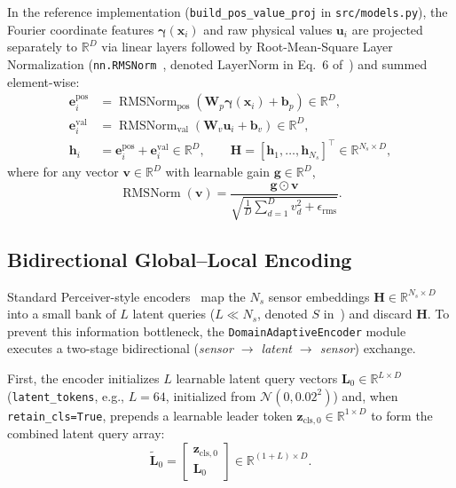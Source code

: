 In the reference implementation (\texttt{build\_pos\_value\_proj} in \texttt{src/models.py}), the Fourier coordinate features $\boldsymbol{\gamma}(\mathbf{x}_i)$ and raw physical values $\mathbf{u}_i$ are projected separately to $\mathbb{R}^D$ via linear layers followed by Root-Mean-Square Layer Normalization (\texttt{nn.RMSNorm}~\cite{zhang2019rmsnorm}, denoted $\text{LayerNorm}$ in Eq.~6 of~\cite{wang2026glu}) and summed element-wise:
\begin{align}
    \mathbf{e}_i^{\text{pos}} &= \operatorname{RMSNorm}_{\text{pos}}\!\left(\mathbf{W}_p \boldsymbol{\gamma}(\mathbf{x}_i) + \mathbf{b}_p\right) \in \mathbb{R}^D, \label{eq:bg_glu_epos} \\
    \mathbf{e}_i^{\text{val}} &= \operatorname{RMSNorm}_{\text{val}}\!\left(\mathbf{W}_v \mathbf{u}_i + \mathbf{b}_v\right) \in \mathbb{R}^D, \label{eq:bg_glu_eval} \\
    \mathbf{h}_i &= \mathbf{e}_i^{\text{pos}} + \mathbf{e}_i^{\text{val}} \in \mathbb{R}^D, \qquad \mathbf{H} = [\mathbf{h}_1, \dots, \mathbf{h}_{N_s}]^\top \in \mathbb{R}^{N_s \times D}, \label{eq:bg_glu_hi}
\end{align}
where for any vector $\mathbf{v} \in \mathbb{R}^D$ with learnable gain $\mathbf{g} \in \mathbb{R}^D$,
\begin{equation}
    \operatorname{RMSNorm}(\mathbf{v}) = \frac{\mathbf{g} \odot \mathbf{v}}{\sqrt{\frac{1}{D}\sum_{d=1}^D v_d^2 + \epsilon_{\text{rms}}}}.
    \label{eq:bg_rmsnorm_def}
\end{equation}

\subsection{Bidirectional Global--Local Encoding}
\label{subsec:bg_glu_encoder}

Standard Perceiver-style encoders~\cite{jaegle2021perceiver, santos2023senseiver} map the $N_s$ sensor embeddings $\mathbf{H} \in \mathbb{R}^{N_s \times D}$ into a small bank of $L$ latent queries ($L \ll N_s$, denoted $S$ in~\cite{wang2026glu}) and discard $\mathbf{H}$. To prevent this information bottleneck, the \texttt{DomainAdaptiveEncoder} module executes a two-stage bidirectional (\emph{sensor $\rightarrow$ latent $\rightarrow$ sensor}) exchange.

First, the encoder initializes $L$ learnable latent query vectors $\mathbf{L}_0 \in \mathbb{R}^{L \times D}$ (\texttt{latent\_tokens}, e.g., $L = 64$, initialized from $\mathcal{N}(0, 0.02^2)$) and, when \texttt{retain\_cls=True}, prepends a learnable leader token $\mathbf{z}_{\text{cls},0} \in \mathbb{R}^{1 \times D}$ to form the combined latent query array:
\begin{equation}
    \tilde{\mathbf{L}}_0 = \begin{bmatrix} \mathbf{z}_{\text{cls},0} \\ \mathbf{L}_0 \end{bmatrix} \in \mathbb{R}^{(1 + L) \times D}.
    \label{eq:bg_glu_latent_bank}
\end{equation}

